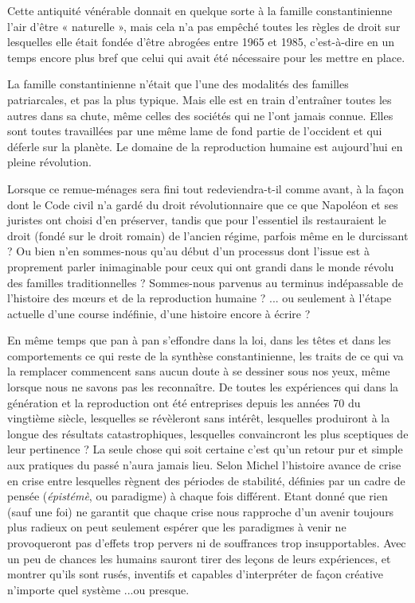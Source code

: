  Cette antiquité vénérable donnait en quelque sorte à la famille constantinienne l'air d'être « naturelle », mais cela n'a pas empêché toutes les règles de droit sur lesquelles elle était fondée d'être abrogées entre 1965 et 1985, c'est-à-dire en un temps encore plus bref que celui qui avait été nécessaire pour les mettre en place. 
 
 La famille constantinienne n'était que l'une des modalités des familles patriarcales, et pas la plus typique. Mais elle est en train d'entraîner toutes les autres dans sa chute, même celles des sociétés qui ne l'ont jamais connue. Elles sont toutes travaillées par une même lame de fond partie de l'occident et qui déferle sur la planète. Le domaine de la reproduction humaine est aujourd'hui en pleine révolution.
  
 Lorsque ce remue-ménages sera fini tout redeviendra-t-il comme avant, à la façon dont le Code civil n'a gardé du droit révolutionnaire que ce que Napoléon et ses juristes ont choisi d'en préserver, tandis que pour l'essentiel ils restauraient le droit (fondé sur le droit romain) de l'ancien régime, parfois même en le durcissant ? Ou bien n'en sommes-nous qu'au début d'un processus dont l'issue est à proprement parler inimaginable pour ceux qui ont grandi dans le monde révolu des familles traditionnelles ? Sommes-nous parvenus au terminus indépassable de l'histoire des mœurs et de la reproduction humaine ? ... ou seulement à l'étape actuelle d'une course indéfinie, d'une histoire encore à écrire ? 
 
 

 En même temps que pan à pan s'effondre dans la loi, dans les têtes et dans les comportements ce qui reste de la synthèse constantinienne, les traits de ce qui va la remplacer commencent sans aucun doute à se dessiner sous nos yeux, même lorsque nous ne savons pas les reconnaître. De toutes les expériences qui dans la génération et la reproduction ont été entreprises depuis les années 70 du vingtième siècle, lesquelles se révèleront sans intérêt, lesquelles produiront à la longue des résultats catastrophiques, lesquelles convaincront les plus sceptiques de leur pertinence ?  La seule chose qui soit certaine c'est qu'un retour pur et simple aux pratiques du passé n'aura jamais lieu.  Selon Michel  l'histoire avance de crise en crise entre lesquelles règnent des périodes de stabilité, définies par un cadre de pensée (\emph{épistémè}, ou paradigme) à chaque fois différent. Etant donné que rien (sauf une foi) ne garantit que chaque crise nous rapproche d'un avenir toujours plus radieux on peut seulement espérer que les paradigmes à venir ne provoqueront pas d'effets trop pervers ni de souffrances trop insupportables. Avec un peu de chances les humains sauront tirer des leçons de leurs expériences, et montrer qu'ils sont rusés, inventifs et capables d'interpréter de façon créative n'importe quel système ...ou presque. 
 
